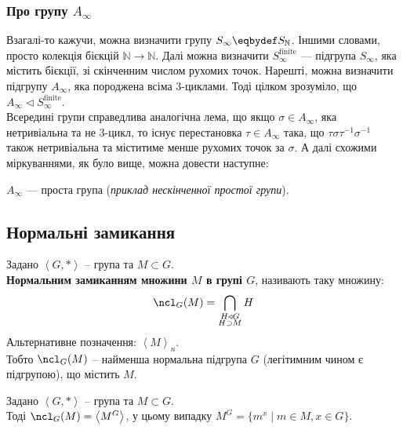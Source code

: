 \documentclass{math_library}
\begin{document}
\subsubsection*{Про групу $A_\infty$}
Взагалі-то кажучи, можна визначити групу $S_\infty \eqbydef S_{\mathbb{N}}$. Іншими словами, просто колекція бієкцій $\mathbb{N} \to \mathbb{N}$. Далі можна визначити $S_{\infty}^{\text{finite}}$ --- підгрупа $S_\infty$, яка містить бієкції, зі скінченним числом рухомих точок. Нарешті, можна визначити підгрупу $A_\infty$, яка породжена всіма $3$-циклами. Тоді цілком зрозуміло, що $A_\infty \triangleleft S_{\infty}^{\text{finite}}$.
\bigskip \\
Всередині групи справедлива аналогічна лема, що якщо $\sigma \in A_\infty$, яка нетривіальна та не $3$-цикл, то існує перестановка $\tau \in A_\infty$ така, що $\tau \sigma \tau^{-1} \sigma^{-1}$ також нетривіальна та міститиме менше рухомих точок за $\sigma$. А далі схожими міркуваннями, як було вище, можна довести наступне:

\begin{theorem}
$A_\infty$ --- проста група (\textit{приклад нескінченної простої групи}).
\end{theorem}

\subsection{Нормальні замикання}
\begin{definition}
Задано $\left< G, *\right>$ -- група та $M \subset G$.\\
\textbf{Нормальним замиканням множини $M$ в групі $G$}, називають таку множину:
\begin{align*}
\ncl_G(M) = \bigcap_{\substack{H \triangleleft G \\ H \supset M}} H
\end{align*}
Альтернативне позначення: $\left< M \right>_n$.\\
Тобто $\ncl_G(M)$ -- найменша нормальна підгрупа $G$ (легітимним чином є підгрупою), що містить $M$.
\end{definition}

\begin{theorem}
Задано $\left<G,*\right>$ -- група та $M \subset G$.\\
Тоді $\ncl_G(M) = \left< M^G \right>$, у цьому випадку $M^G = \{m^x \mid m \in M,x \in G\}$.
\end{theorem}
\end{document}
